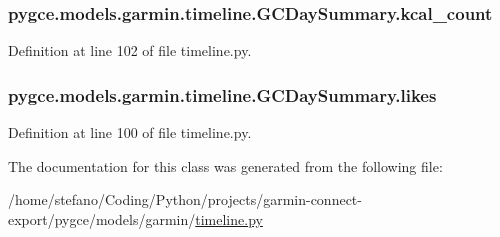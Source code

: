 \subsubsection[{\texorpdfstring{kcal\+\_\+count}{kcal_count}}]{\setlength{\rightskip}{0pt plus 5cm}pygce.\+models.\+garmin.\+timeline.\+G\+C\+Day\+Summary.\+kcal\+\_\+count}\hypertarget{classpygce_1_1models_1_1garmin_1_1timeline_1_1_g_c_day_summary_a16ed8d554c0349a90d281cbd58608153}{}\label{classpygce_1_1models_1_1garmin_1_1timeline_1_1_g_c_day_summary_a16ed8d554c0349a90d281cbd58608153}


Definition at line 102 of file timeline.\+py.

\subsubsection[{\texorpdfstring{likes}{likes}}]{\setlength{\rightskip}{0pt plus 5cm}pygce.\+models.\+garmin.\+timeline.\+G\+C\+Day\+Summary.\+likes}\hypertarget{classpygce_1_1models_1_1garmin_1_1timeline_1_1_g_c_day_summary_a3fc863d92101994b0c2263b6f0cae4c4}{}\label{classpygce_1_1models_1_1garmin_1_1timeline_1_1_g_c_day_summary_a3fc863d92101994b0c2263b6f0cae4c4}


Definition at line 100 of file timeline.\+py.



The documentation for this class was generated from the following file\+:\begin{DoxyCompactItemize}
\item 
/home/stefano/\+Coding/\+Python/projects/garmin-\/connect-\/export/pygce/models/garmin/\hyperlink{timeline_8py}{timeline.\+py}\end{DoxyCompactItemize}
